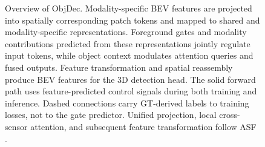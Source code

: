 \begin{figure}[p]
\centering
{}
\caption{Overview of ObjDec. Modality-specific BEV features are projected into spatially corresponding patch tokens and mapped to shared and modality-specific representations. Foreground gates and modality contributions predicted from these representations jointly regulate input tokens, while object context modulates attention queries and fused outputs. Feature transformation and spatial reassembly produce BEV features for the 3D detection head. The solid forward path uses feature-predicted control signals during both training and inference. Dashed connections carry GT-derived labels to training losses, not to the gate predictor. Unified projection, local cross-sensor attention, and subsequent feature transformation follow ASF \citep{paek2025asf}.}
\label{fig:2}
\end{figure}

